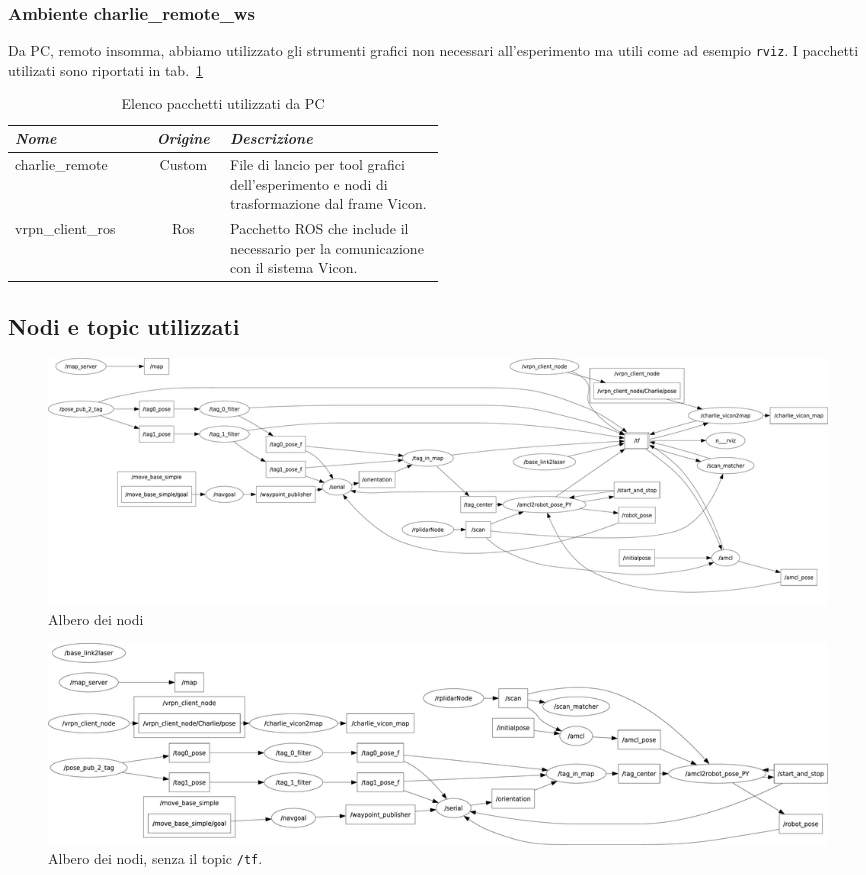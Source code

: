 \subsubsection*{Ambiente charlie\_remote\_ws}
Da PC, remoto insomma, abbiamo utilizzato gli strumenti grafici non necessari all'esperimento ma utili come ad esempio \verb|rviz|. I pacchetti utilizati sono riportati in tab.~\ref{tab: pacchetti remoto}
\begin{table}[h]
	\centering
	\begin{tabular}{lcp{0.5\linewidth}}
		\textit{Nome} 	& \textit{Origine} & \textit{Descrizione} \\
		\hline
		charlie\_remote			& Custom	& File di lancio per tool grafici dell'esperimento e nodi di trasformazione dal frame Vicon.\\
		vrpn\_client\_ros		& Ros		& Pacchetto ROS che include il necessario per la comunicazione con il sistema Vicon.\\
	\end{tabular}
	\caption{Elenco pacchetti utilizzati da PC}
	\label{tab: pacchetti remoto}
\end{table}
\FloatBarrier

	
\subsection{Nodi e topic utilizzati}

\begin{figure}[h]
	\centering
	\includegraphics[width=\linewidth]{nodes_withtf_tree.pdf}
	\caption{Albero dei nodi}
	\label{fig: rqt_graph}
\end{figure}

\begin{figure}[h]
	\centering
	\includegraphics[width=\linewidth]{nodes_tree.pdf}
	\caption{Albero dei nodi, senza il topic \texttt{/tf}.}
	\label{fig: rqt_graph no tf}
\end{figure}



